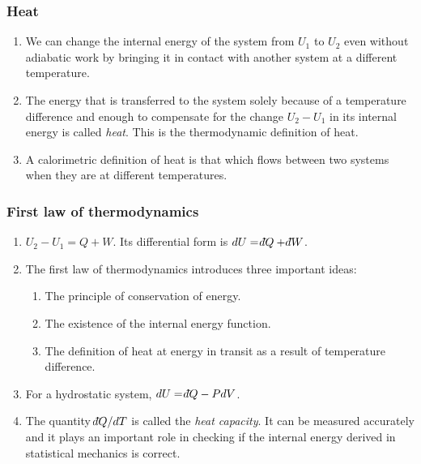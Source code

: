 \documentclass{beamer}
\newcommand{\dbar}{{\mathchar'26\mkern-13mu d}}
\begin{document}
\begin{frame}
\frametitle{Heat}
\begin{enumerate}
\item We can change the internal energy of the system from $U_1$ to $U_2$ even without adiabatic work by bringing it in contact
with another system at a different temperature.
\item The energy that is transferred to the system solely because of a temperature difference and enough to compensate for the 
change $U_2 - U_1$ in its internal energy is called \emph{heat}. This is the thermodynamic definition of heat.
\item A calorimetric definition of heat is that which flows between two systems when they are at different temperatures.
\end{enumerate}
\end{frame}

\begin{frame}
\frametitle{First law of thermodynamics}
\begin{enumerate}
\item $U_2 - U_1 = Q + W$. Its differential form is $dU = \dbar Q + \dbar W$. 
\item The first law of thermodynamics introduces three important ideas:
\begin{enumerate}
\item The principle of conservation of energy.
\item The existence of the internal energy function.
\item The definition of heat at energy in transit as a result of temperature difference.
\end{enumerate}
\item For a hydrostatic system, $dU = \dbar Q - PdV$.
\item The quantity $\dbar Q/dT$ is called the \emph{heat capacity}. It can be measured accurately and it plays an important
role in checking if the internal energy derived in statistical mechanics is correct.
\end{enumerate}
\end{frame}
\end{document}
